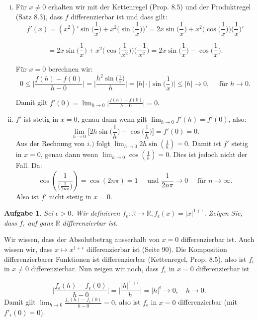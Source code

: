 \documentclass[a4paper, 20]{exam}
\newtheorem{ex}{Aufgabe}
\newcommand\RR{\mathbb{R}}
\begin{document}
\begin{solution}
\begin{enumerate}[i.)]
\item
F\"ur $x\neq 0$ erhalten wir mit der Kettenregel (Prop. 8.5) und der Produktregel (Satz 8.3), dass $f$ differenzierbar ist und dass gilt:
$$ f'(x)= (x^2)' \sin\bigg(\frac{1}{x}\bigg) + x^2 \bigg(\sin\bigg(\frac{1}{x}\bigg)\bigg)'
= 2x \sin\bigg(\frac{1}{x}\bigg) + x^2 \bigg(\cos\bigg(\frac{1}{x}\bigg)\bigg) \bigg( \frac{1}{x} \bigg)'$$

$$= 2x \sin\bigg(\frac{1}{x}\bigg) + x^2 \bigg(\cos\bigg(\frac{1}{x^2}\bigg)\bigg) \bigg( \frac{-1}{x^2} \bigg) 
= 2x \sin\bigg(\frac{1}{x}\bigg) - \cos\bigg(\frac{1}{x}\bigg) .$$

F\"ur $x=0$ berechnen wir:
$$0 \leq \bigg\vert \frac{f(h)-f(0)}{h-0} \bigg\vert 
= \bigg\vert \frac{h^2 \sin\big(\frac{1}{x}\big) }{h} \bigg\vert
= \vert h \vert \cdot \bigg\vert \sin\bigg(\frac{1}{x}\bigg) \bigg\vert
\leq \vert h \vert \longrightarrow 0, \quad \text{ f\"ur } h\longrightarrow 0.$$

Damit gilt $f'(0) = \lim_{h\rightarrow 0} \bigg\vert \frac{f(h)-f(0)}{h-0} \bigg\vert =0$.
\item
$f'$ ist stetig in $x=0$, genau dann wenn gilt $\lim_{h\rightarrow 0}f'(h) = f'(0)$, also:
$$ \lim_{h\rightarrow 0} \bigg[ 2h \sin\bigg(\frac{1}{h}\bigg) - \cos\bigg(\frac{1}{h}\bigg) \bigg]=f'(0)=0.$$
Aus der Rechnung von $i.)$ folgt $\lim_{h\rightarrow 0} 2h \sin\left(\frac{1}{h}\right)=0$. Damit ist $f'$ stetig in $x=0$, genau dann wenn $\lim_{h \rightarrow 0} \cos\left(\frac{1}{h}\right)=0$. Dies ist jedoch nicht der Fall. Da:
$$ \cos\left(\frac{1}{\bigg( \frac{1}{2n\pi} \bigg)}\right) = \cos(2n\pi) = 1 \quad \text{ und }  \frac{1}{2n\pi} \longrightarrow 0 \quad \text{ f\"ur } n \longrightarrow \infty.$$
Also ist $f'$ nicht stetig in $x=0$.
\end{enumerate}
\end{solution}

\begin{ex}
Sei $\epsilon>0$. Wir definieren $f_{\epsilon}:\RR \longrightarrow \RR, f_{\epsilon}(x)= \vert x \vert^{1+\epsilon}$.
Zeigen Sie, dass $f_{\epsilon}$ auf ganz $\RR$ differenzierbar ist.
\end{ex}
\begin{solution}
Wir wissen, dass der Absolutbetrag ausserhalb von $x=0$ differenzierbar ist. Auch wissen wir, dass $x\longmapsto x^{1+\epsilon}$ differenzierbar ist (Seite 90). Die Komposition differenzierbarer Funktionen ist differenzierbar (Kettenregel, Prop. 8.5), also ist $f_{\epsilon}$ in $x\neq 0$ differenzierbar. Nun zeigen wir noch, dass $f_{\epsilon}$ in $x=0$ differenzierbar ist

$$\bigg\vert \frac{f_{\epsilon}(h)- f_{\epsilon}(0)}{h-0} \bigg\vert 
= \bigg\vert \frac{\vert h \vert^{1+\epsilon}}{h} \bigg\vert 
= \vert h \vert^{\epsilon} \longrightarrow 0, \quad h \longrightarrow 0.$$
Damit gilt $\lim_{h\rightarrow 0} \frac{f_{\epsilon}(h)-f_{\epsilon}(0)}{h-0}=0$, also ist $f_{\epsilon}$ in $x=0$ differenzierbar (mit $f'_{\epsilon}(0)=0$).
\end{solution}
\end{document}
